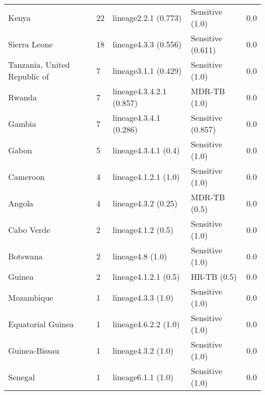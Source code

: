 \begin{tabular}{lllll}
 Kenya                                        & 22                    & lineage2.2.1 (0.773)     & Sensitive (1.0)     & 0.0        \\
 Sierra Leone                                 & 18                    & lineage4.3.3 (0.556)     & Sensitive (0.611)   & 0.0        \\
 Tanzania, United Republic of                 & 7                     & lineage3.1.1 (0.429)     & Sensitive (1.0)     & 0.0        \\
 Rwanda                                       & 7                     & lineage4.3.4.2.1 (0.857) & MDR-TB (1.0)        & 0.0        \\
 Gambia                                       & 7                     & lineage4.3.4.1 (0.286)   & Sensitive (0.857)   & 0.0        \\
 Gabon                                        & 5                     & lineage4.3.4.1 (0.4)     & Sensitive (1.0)     & 0.0        \\
 Cameroon                                     & 4                     & lineage4.1.2.1 (1.0)     & Sensitive (1.0)     & 0.0        \\
 Angola                                       & 4                     & lineage4.3.2 (0.25)      & MDR-TB (0.5)        & 0.0        \\
 Cabo Verde                                   & 2                     & lineage4.1.2 (0.5)       & Sensitive (1.0)     & 0.0        \\
 Botswana                                     & 2                     & lineage4.8 (1.0)         & Sensitive (1.0)     & 0.0        \\
 Guinea                                       & 2                     & lineage4.1.2.1 (0.5)     & HR-TB (0.5)         & 0.0        \\
 Mozambique                                   & 1                     & lineage4.3.3 (1.0)       & Sensitive (1.0)     & 0.0        \\
 Equatorial Guinea                            & 1                     & lineage4.6.2.2 (1.0)     & Sensitive (1.0)     & 0.0        \\
 Guinea-Bissau                                & 1                     & lineage4.3.2 (1.0)       & Sensitive (1.0)     & 0.0        \\
 Senegal                                      & 1                     & lineage6.1.1 (1.0)       & Sensitive (1.0)     & 0.0        \\

\end{tabular}
